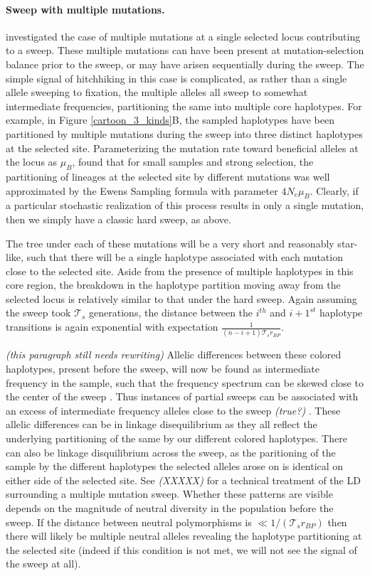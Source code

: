 \documentclass[a4paper,10pt]{article}
\newcommand{\gc}[1]{{\it \color{red} (#1)} }
\newcommand{\jb}[1]{{\it\color{blue} (#1)} }
\begin{document}
\paragraph{Sweep with multiple mutations.}
\citet{Pennings2006a, Pennings2006} investigated the case of multiple mutations at a single selected locus contributing to a sweep. These multiple mutations can have been present at mutation-selection balance prior to the sweep, or may have arisen sequentially during the sweep. The simple signal of hitchhiking in this case is complicated, as rather than a single allele sweeping to fixation, the multiple alleles all sweep to somewhat intermediate frequencies, partitioning the same into multiple core haplotypes. For example, in Figure \ref{cartoon_3_kinds}B, the sampled haplotypes have been partitioned by multiple mutations during the sweep into three distinct haplotypes at the selected site. Parameterizing the mutation rate toward beneficial alleles at the locus as $\mu_{B}$, \cite {Pennings2006a} found that for small samples and strong selection, the partitioning of lineages at the selected site by different mutations was well approximated by the Ewens Sampling formula with parameter $4N_e\mu_B$. Clearly, if a particular stochastic realization of this process results in only a single mutation, then we simply have a classic hard sweep, as above.

The tree under each of these mutations will be a very short and reasonably star-like, such that there will be a single haplotype associated with each mutation close to the selected site. Aside from the presence of multiple haplotypes in this core region, the breakdown in the haplotype partition moving away from the selected locus is relatively similar to that under the hard sweep. Again assuming the sweep took $\mathcal{T}_s$ generations, the distance between the $i^{th}$ and $i+1^{st}$ haplotype transitions is again exponential with expectation $\frac{1}{\left(n-i+1\right)\mathcal{T}_s r_{BP}}$.

\jb{this paragraph still needs rewriting}
Allelic differences between these colored haplotypes, present before the sweep, will now be found as intermediate frequency in the sample, such that the frequency spectrum can be skewed close to the center of the sweep \citep{Pennings2006}. Thus instances of partial sweeps can be associated with an excess of intermediate frequency alleles close to the sweep \gc{true?}. These allelic differences can be in linkage disequilibrium as they all reflect the underlying partitioning of the same by our different colored haplotypes. There can also be linkage disquilibrium across the sweep, as the paritioning of the sample by the different haplotypes the selected alleles arose on is identical on either side of the selected site. See \gc{XXXXX} for a technical treatment of the LD surrounding a multiple mutation sweep. Whether these patterns are visible depends on the magnitude of neutral diversity in the population before the sweep. If the distance between neutral polymorphisms is $\ll 1/(\mathcal{T}_s r_{BP})$ then there will likely be multiple neutral alleles revealing the haplotype partitioning at the selected site (indeed if this condition is not met, we will not see the signal of the sweep at all).
\end{document}
